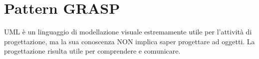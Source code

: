 \chapter{Pattern GRASP}
UML è un linguaggio di modellazione visuale estremamente utile per l'attività di progettazione,
ma la sua conoscenza NON implica saper progettare ad oggetti. La progettazione risulta utile
per comprendere e comunicare.